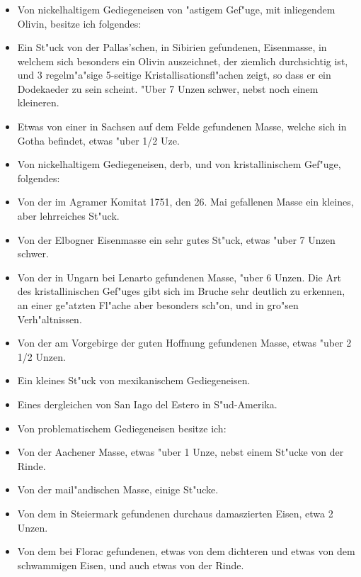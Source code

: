 \documentclass[a4paper, 11pt, oneside, polutonikogreek, german]{article}
\begin{document}
\subsubsection*{}
\begin{itemize}
    \item Von nickelhaltigem Gediegeneisen von "astigem Gef"uge, mit inliegendem Olivin, besitze ich folgendes:
    \item Ein St"uck von der Pallas'schen, in Sibirien gefundenen, Eisenmasse, in welchem sich besonders ein Olivin auszeichnet, der ziemlich durchsichtig ist, und 3 regelm"a"sige 5-seitige Kristallisationsfl"achen zeigt, so dass er ein Dodekaeder zu sein scheint. "Uber 7 Unzen schwer, nebst noch einem kleineren.
    \item Etwas von einer in Sachsen auf dem Felde gefundenen Masse, welche sich in Gotha befindet, etwas "uber 1/2 Uze.
    \item Von nickelhaltigem Gediegeneisen, derb, und von kristallinischem Gef"uge, folgendes:
    \item Von der im Agramer Komitat 1751, den 26. Mai gefallenen Masse ein kleines, aber lehrreiches St"uck.
    \item Von der Elbogner Eisenmasse ein sehr gutes St"uck, etwas "uber 7 Unzen schwer.
    \item Von der in Ungarn bei Lenarto gefundenen Masse, "uber 6 Unzen. Die Art des kristallinischen Gef"uges gibt sich im Bruche sehr deutlich zu erkennen, an einer ge"atzten Fl"ache aber besonders sch"on, und in gro"sen Verh"altnissen.
    \item Von der am Vorgebirge der guten Hoffnung gefundenen Masse, etwas "uber 2 1/2 Unzen.
    \item Ein kleines St"uck von mexikanischem Gediegeneisen.
    \item Eines dergleichen von San Iago del Estero in S"ud-Amerika.
    \item Von problematischem Gediegeneisen besitze ich:
    \item Von der Aachener Masse, etwas "uber 1 Unze, nebst einem St"ucke von der Rinde.
    \item Von der mail"andischen Masse, einige St"ucke.
    \item Von dem in Steiermark gefundenen durchaus damaszierten Eisen, etwa 2 Unzen.
    \item Von dem bei Florac gefundenen, etwas von dem dichteren und etwas von dem schwammigen Eisen, und auch etwas von der Rinde.
\end{itemize}
\end{document}
